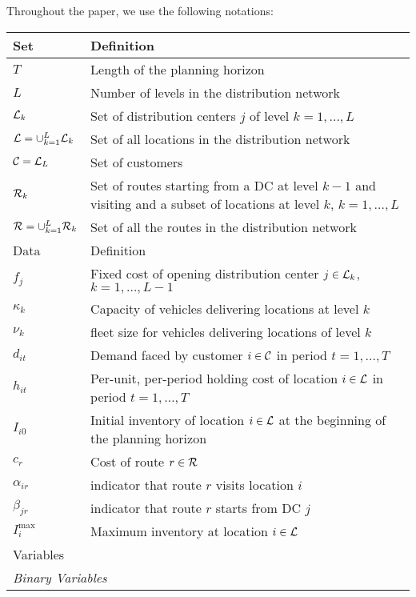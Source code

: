 \documentclass[10pt, a4paper]{article}
\begin{document}
Throughout the paper, we use the following notations:
\begin{table}
    \centering
    \begin{tabular}{ll}
        \hline
        Set & Definition \\
        \hline
        $T$ & Length of the planning horizon\\
        $L$ & Number of levels in the distribution network\\
        $\mathcal{L}_k$ & Set of distribution centers $j$ of level $k=1, \ldots,L$ \\
        $\mathcal{L}=\cup_{k=1}^L \mathcal{L}_k$ & Set of all locations in the distribution network\\
        $\mathcal{C}=\mathcal{L}_L$ & Set of customers \\ 
        $\mathcal{R}_k$ & Set of routes starting from a DC at level $k-1$ and visiting and a subset of locations at level $k$, $k=1,\ldots,L$\\
        $\mathcal{R} = \cup_{k=1}^{L} \mathcal{R}_k$ & Set of all the routes in the distribution network\\
        \hline
        \hline
        Data & Definition \\
        \hline
        $f_j$ & Fixed cost of opening distribution center $j\in\mathcal{L}_k$, $k=1,\ldots,L-1$\\ 
        $\kappa_k$ & Capacity of vehicles delivering locations at level $k$\\ 
        $\nu_k$ & fleet size for vehicles delivering locations of level $k$\\ 
        $d_{it}$ & Demand faced by customer $i\in\mathcal{C}$ in period $t=1,\ldots,T$\\
        $h_{it}$ & Per-unit, per-period holding cost of location $i\in\mathcal{L}$ in period $t=1,\ldots, T$\\
        $I_{i0}$ & Initial inventory of location $i\in \mathcal{L}$ at the beginning of the planning horizon\\
        $c_r$ & Cost of route $r\in \mathcal{R}$\\
        $\alpha_{ir}$ & indicator that route $r$ visits location $i$\\
        $\beta_{jr}$ & indicator that route $r$ starts from DC $j$\\
        $I_i^{\max}$ & Maximum inventory at location $i\in\mathcal{L}$\\
        \hline
        \hline
        \multicolumn{2}{l}{Variables}\\
        \hline
        \multicolumn{2}{l}{\textit{Binary Variables}}\\

\end{tabular}
\end{table}
\end{document}
